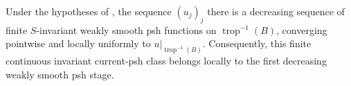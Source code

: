 \begin{corollary}
\label{cor:p023-invariant-toric-weakly-smooth-regularization}
Under the hypotheses of
, the sequence
\((u_j)_j\) there is a decreasing sequence of finite \(S\)-invariant weakly
smooth psh functions on \(\operatorname{trop}^{-1}(B)\), converging pointwise
and locally uniformly to \(u|_{\operatorname{trop}^{-1}(B)}\).
Consequently, this finite continuous invariant current-psh class belongs
locally to the first decreasing weakly smooth psh stage.
\end{corollary}
